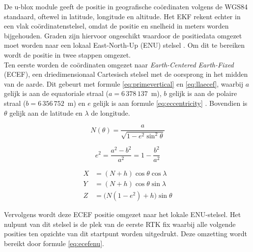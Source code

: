 De u-blox module geeft de positie in geografische coördinaten volgens de WGS84 standaard, oftewel in latitude, longitude en altitude. Het EKF rekent echter in een vlak coördinatenstelsel, omdat de positie en snelheid in meters worden bijgehouden. Graden zijn hiervoor ongeschikt waardoor de positiedata omgezet moet worden naar een lokaal East-North-Up (ENU) stelsel \cite{local_tangent}. Om dit te bereiken wordt de positie in twee stappen omgezet. \\

Ten eerste worden de coördinaten omgezet naar \textit{Earth-Centered Earth-Fixed} (ECEF), een driedimensionaal Cartesisch stelsel met de oorsprong in het midden van de aarde. Dit gebeurt met formule \ref{eq:primevertical} en \ref{eq:llaecef}, waarbij $a$ gelijk is aan de equatoriale straal ($a = 6\,378\,137$~m), $b$ gelijk is aan de polaire straal ($b = 6\,356\,752$~m) en $e$ gelijk is aan formule \ref{eq:eccentricity} \cite{geo_conversion}. Bovendien is $\theta$ gelijk aan de latitude en $\lambda$ de longitude.

\begin{equation}
    N(\theta) = \frac{a}{\sqrt{1 - e^2 \sin^2\theta}}
    \label{eq:primevertical}
\end{equation}

\begin{equation}
    e^2 = \frac{a^2 - b^2}{a^2} = 1 - \frac{b^2}{a^2}
    \label{eq:eccentricity}
\end{equation}

\begin{equation}
    \begin{aligned}
        X &= (N + h)\cos\theta\cos\lambda \\
        Y &= (N + h)\cos\theta\sin\lambda \\
        Z &= \bigl(N(1 - e^2) + h\bigr)\sin\theta
    \end{aligned}
    \label{eq:llaecef}
\end{equation}

Vervolgens wordt deze ECEF positie omgezet naar het lokale ENU-stelsel. Het nulpunt van dit stelsel is de plek van de eerste RTK fix waarbij alle volgende posities ten opzichte van dit startpunt worden uitgedrukt. Deze omzetting wordt bereikt door formule \ref{eq:ecefenu}.

